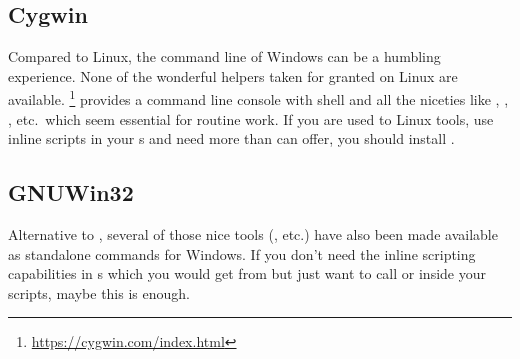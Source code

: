 \subsection{Cygwin}
\label{sec:landscapes:cygwin}

Compared to Linux, the command line of Windows can be a humbling experience. None of
the wonderful helpers taken for granted on Linux are
available. \footnote{\url{https://cygwin.com/index.html}}
provides a command line console with  shell and all the
niceties like , , , etc.\ which seem
essential for routine work.  If you are used to Linux tools, use
inline scripts in your s and need more than  can
offer, you should install .

\subsection{GNUWin32}
\label{sec:landscapes:GNUwin32}

Alternative to , several of those nice tools (,
 etc.) have also been made available as standalone commands
for Windows. If you don't need the inline scripting capabilities in
s which you would get from  but just want to call
 or  inside your  scripts, maybe this is enough.



